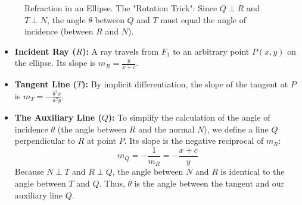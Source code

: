 \documentclass{article}
\begin{document}
\begin{figure}[h]
    \caption{Refraction in an Ellipse. The "Rotation Trick": Since $Q \perp R$ and $T \perp N$, the angle $\theta$ between $Q$ and $T$ must equal the angle of incidence (between $R$ and $N$).}
    \label{fig:ellipse_refraction}
\end{figure}

\begin{itemize}
    \item \textbf{Incident Ray ($R$):} A ray travels from $F_1$ to an arbitrary point $P(x, y)$ on the ellipse. Its slope is $m_R = \frac{y}{x+c}$.
    \item \textbf{Tangent Line ($T$):} By implicit differentiation, the slope of the tangent at $P$ is $m_T = -\frac{b^2x}{a^2y}$.
    \item \textbf{The Auxiliary Line ($Q$):} To simplify the calculation of the angle of incidence $\theta$ (the angle between $R$ and the normal $N$), we define a line $Q$ perpendicular to $R$ at point $P$. Its slope is the negative reciprocal of $m_R$:
    \[ m_Q = -\frac{1}{m_R} = -\frac{x+c}{y} \]
    Because $N \perp T$ and $R \perp Q$, the angle between $N$ and $R$ is identical to the angle between $T$ and $Q$. Thus, $\theta$ is the angle between the tangent and our auxiliary line $Q$.
\end{itemize}
\end{document}

